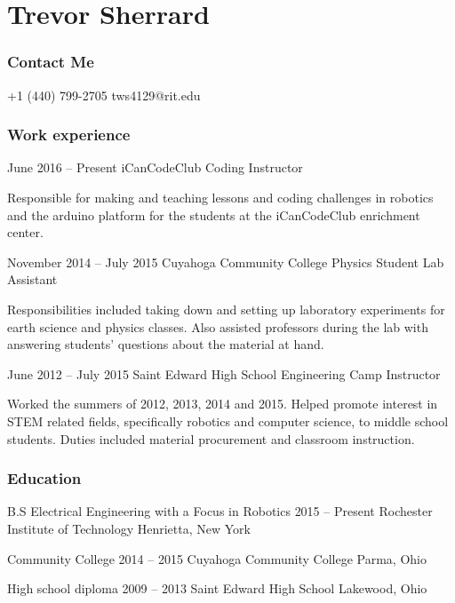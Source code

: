 \documentclass{tccv}
\begin{document}
\part{Trevor Sherrard}
\section{Contact Me}
\begin{eventlist}
    {+1 (440) 799-2705}
    {tws4129@rit.edu}
    
\end{eventlist}

\section{Work experience}

\begin{eventlist}

\item{June 2016 -- Present}
	 {iCanCodeClub}
	 {Coding Instructor}
	 
Responsible for making and teaching lessons and coding challenges in robotics and the arduino platform for the students at the iCanCodeClub enrichment center.

\item{November 2014 -- July 2015}
     {Cuyahoga Community College}
     {Physics Student Lab Assistant }

Responsibilities included taking down and setting up laboratory experiments for earth science and physics classes. Also assisted professors during the lab with answering students' questions about the material at hand.

\item{June 2012 -- July 2015}
     {Saint Edward High School}
     {Engineering Camp Instructor}
     
Worked the summers of 2012, 2013, 2014 and 2015. Helped promote interest in STEM related fields, specifically robotics and computer science, to middle school students. Duties included material procurement and classroom instruction.
\end{eventlist}

\section{Education}

\begin{yearlist}

\item[B.S Electrical Engineering with a Focus in Robotics]{2015 -- Present}
     {Rochester Institute of Technology}
     {Henrietta, New York}
     
\item[Community College]{2014 -- 2015}
     {Cuyahoga Community College}
     {Parma, Ohio}
     
\item[High school diploma]{2009 -- 2013}
     {Saint Edward High School}
     {Lakewood, Ohio}

\end{yearlist}
\end{document}
